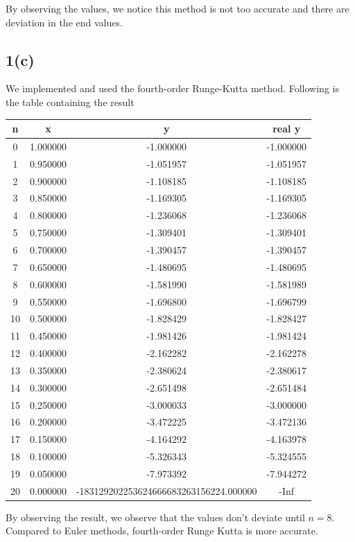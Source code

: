 \documentclass{article}
\begin{document}
By observing the values, we notice this method is not too accurate and there are deviation in the end values.
\begin{equation*}
\end{equation*}
\subsection*{1(c)}
We implemented and used the fourth-order Runge-Kutta method. Following is the table containing the result
\begin{center}
\begin{tabular}{|c|c|c|c|}
\hline
n & x & y & real y \\ \hline
0 & 1.000000 & -1.000000 & -1.000000 \\ \hline 
1 & 0.950000 & -1.051957 & -1.051957 \\ \hline 
2 & 0.900000 & -1.108185 & -1.108185 \\ \hline 
3 & 0.850000 & -1.169305 & -1.169305 \\ \hline 
4 & 0.800000 & -1.236068 & -1.236068 \\ \hline 
5 & 0.750000 & -1.309401 & -1.309401 \\ \hline 
6 & 0.700000 & -1.390457 & -1.390457 \\ \hline 
7 & 0.650000 & -1.480695 & -1.480695 \\ \hline 
8 & 0.600000 & -1.581990 & -1.581989 \\ \hline 
9 & 0.550000 & -1.696800 & -1.696799 \\ \hline 
10 & 0.500000 & -1.828429 & -1.828427 \\ \hline 
11 & 0.450000 & -1.981426 & -1.981424 \\ \hline 
12 & 0.400000 & -2.162282 & -2.162278 \\ \hline 
13 & 0.350000 & -2.380624 & -2.380617 \\ \hline 
14 & 0.300000 & -2.651498 & -2.651484 \\ \hline 
15 & 0.250000 & -3.000033 & -3.000000 \\ \hline 
16 & 0.200000 & -3.472225 & -3.472136 \\ \hline 
17 & 0.150000 & -4.164292 & -4.163978 \\ \hline 
18 & 0.100000 & -5.326343 & -5.324555 \\ \hline 
19 & 0.050000 & -7.973392 & -7.944272 \\ \hline 
20 & 0.000000 & -183129202253624666683263156224.000000 & -Inf \\ \hline 
\end{tabular}
\end{center}
By observing the result, we observe that the values don't deviate until $n=8$. Compared to Euler methods, fourth-order Runge Kutta is more accurate.
\end{document}
